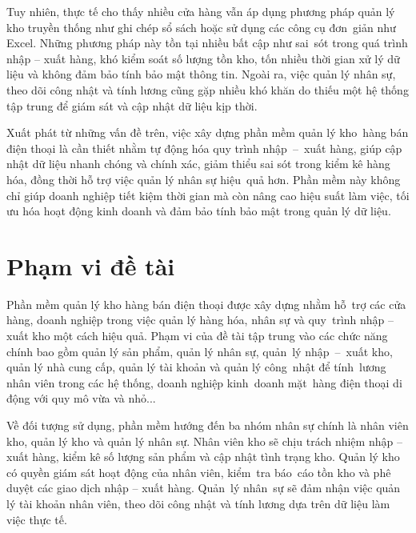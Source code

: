 \documentclass[a4paper,12pt]{report}
\begin{document}
\vspace{0.8em}

\quad Tuy nhiên, thực tế cho thấy nhiều cửa hàng vẫn áp dụng phương pháp quản lý kho truyền thống như ghi chép sổ sách hoặc sử dụng các công cụ đơn~giản như Excel. Những phương pháp này tồn tại nhiều bất cập như sai~sót trong quá trình nhập – xuất hàng, khó kiểm soát số lượng tồn kho, tốn nhiều thời gian xử lý dữ liệu và không đảm bảo tính bảo mật thông tin. Ngoài ra, việc quản lý nhân sự, theo dõi công nhật và tính lương cũng gặp nhiều khó khăn do thiếu một hệ thống tập trung để giám sát và cập nhật dữ liệu kịp thời.

\vspace{0.8em}

\quad Xuất phát từ những vấn đề trên, việc xây dựng phần mềm quản lý kho~hàng bán điện thoại là cần thiết nhằm tự động hóa quy trình nhập~–~xuất hàng, giúp cập nhật dữ liệu nhanh chóng và chính xác, giảm thiểu sai sót trong kiểm kê hàng hóa, đồng thời hỗ trợ việc quản lý nhân sự hiệu~quả hơn. Phần mềm này không chỉ giúp doanh nghiệp tiết kiệm thời gian mà còn nâng cao hiệu suất làm việc, tối ưu hóa hoạt động kinh doanh và đảm bảo tính bảo mật trong quản lý dữ liệu.
\section{Phạm vi đề tài}
\quad Phần mềm quản lý kho hàng bán điện thoại được xây dựng nhằm hỗ~trợ các cửa hàng, doanh nghiệp trong việc quản lý hàng hóa, nhân sự và quy~trình nhập – xuất kho một cách hiệu quả. Phạm vi của đề tài tập trung vào các chức năng chính bao gồm quản lý sản phẩm, quản lý nhân sự, quản~lý nhập~–~xuất kho, quản lý nhà cung cấp, quản lý tài khoản và quản lý công~nhật để tính~lương nhân viên trong các hệ thống, doanh nghiệp kinh~doanh mặt~hàng điện thoại di động với quy mô vừa và nhỏ...

\vspace{0.8em}

\quad Về đối tượng sử dụng, phần mềm hướng đến ba nhóm nhân sự chính là nhân viên kho, quản lý kho và quản lý nhân sự. Nhân viên kho sẽ chịu trách nhiệm nhập – xuất hàng, kiểm kê số lượng sản phẩm và cập nhật tình trạng kho. Quản lý kho có quyền giám sát hoạt động của nhân viên, kiểm~tra báo~cáo tồn kho và phê duyệt các giao dịch nhập – xuất hàng. Quản~lý nhân~sự sẽ đảm nhận việc quản lý tài khoản nhân viên, theo dõi công nhật và tính lương dựa trên dữ liệu làm việc thực tế.

\vspace{0.8em}
\end{document}
